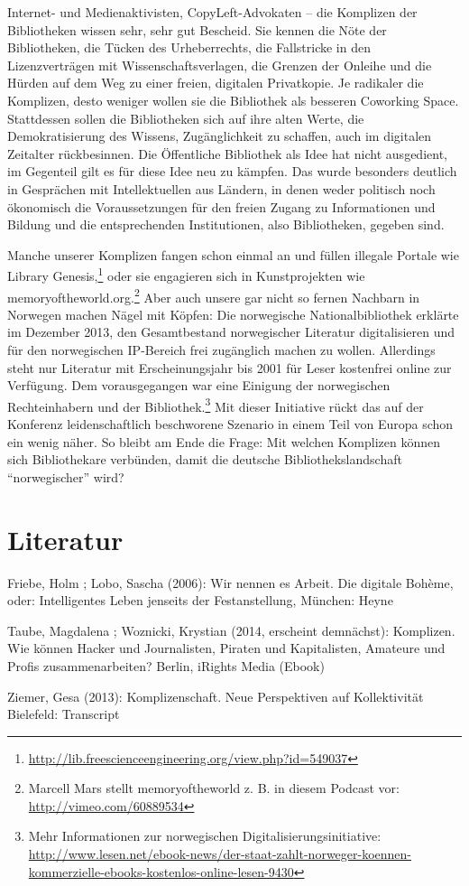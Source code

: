 \documentclass[a4paper,
fontsize=11pt,
oneside,
numbers=noperiodatend,
parskip=half-,
bibliography=totoc,
final
]{scrartcl}
\begin{document}
Internet- und Medienaktivisten, CopyLeft-Advokaten -- die Komplizen der
Bibliotheken wissen sehr, sehr gut Bescheid. Sie kennen die Nöte der
Bibliotheken, die Tücken des Urheberrechts, die Fallstricke in den
Lizenzverträgen mit Wissenschaftsverlagen, die Grenzen der Onleihe und
die Hürden auf dem Weg zu einer freien, digitalen Privatkopie. Je
radikaler die Komplizen, desto weniger wollen sie die Bibliothek als
besseren Coworking Space. Stattdessen sollen die Bibliotheken sich auf
ihre alten Werte, die Demokratisierung des Wissens, Zugänglichkeit zu
schaffen, auch im digitalen Zeitalter rückbesinnen. Die Öffentliche
Bibliothek als Idee hat nicht ausgedient, im Gegenteil gilt es für diese
Idee neu zu kämpfen. Das wurde besonders deutlich in Gesprächen mit
Intellektuellen aus Ländern, in denen weder politisch noch ökonomisch
die Voraussetzungen für den freien Zugang zu Informationen und Bildung
und die entsprechenden Institutionen, also Bibliotheken, gegeben sind.

Manche unserer Komplizen fangen schon einmal an und füllen illegale
Portale wie Library Genesis,\footnote{\url{http://lib.freescienceengineering.org/view.php?id=549037}}
oder sie engagieren sich in Kunstprojekten wie
memoryoftheworld.org.\footnote{Marcell Mars stellt memoryoftheworld z.
  B. in diesem Podcast vor: \url{http://vimeo.com/60889534}} Aber auch
unsere gar nicht so fernen Nachbarn in Norwegen machen Nägel mit Köpfen:
Die norwegische Nationalbibliothek erklärte im Dezember 2013, den
Gesamtbestand norwegischer Literatur digitalisieren und für den
norwegischen IP-Bereich frei zugänglich machen zu wollen. Allerdings
steht nur Literatur mit Erscheinungsjahr bis 2001 für Leser kostenfrei
online zur Verfügung. Dem vorausgegangen war eine Einigung der
norwegischen Rechteinhabern und der Bibliothek.\footnote{Mehr
  Informationen zur norwegischen Digitalisierungsinitiative:
  \url{http://www.lesen.net/ebook-news/der-staat-zahlt-norweger-koennen-kommerzielle-ebooks-kostenlos-online-lesen-9430}}
Mit dieser Initiative rückt das auf der Konferenz leidenschaftlich
beschworene Szenario in einem Teil von Europa schon ein wenig näher. So
bleibt am Ende die Frage: Mit welchen Komplizen können sich
Bibliothekare verbünden, damit die deutsche Bibliothekslandschaft
\enquote{norwegischer} wird?

\section*{Literatur}\label{literatur}

Friebe, Holm ; Lobo, Sascha (2006): Wir nennen es Arbeit. Die digitale
Bohème, oder: Intelligentes Leben jenseits der Festanstellung, München:
Heyne

Taube, Magdalena ; Woznicki, Krystian (2014, erscheint demnächst):
Komplizen. Wie können Hacker und Journalisten, Piraten und Kapitalisten,
Amateure und Profis zusammenarbeiten? Berlin, iRights Media (Ebook)

Ziemer, Gesa (2013): Komplizenschaft. Neue Perspektiven auf
Kollektivität Bielefeld: Transcript
\end{document}

